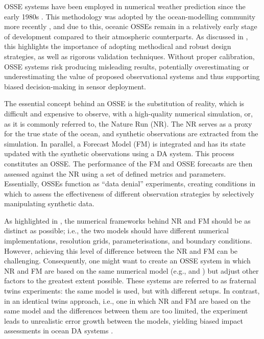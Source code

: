 OSSE systems have been employed in numerical weather prediction since the early 1980s \parencite{atlas1985impact, atlas1997atmospheric}. This methodology was adopted by the ocean-modelling community more recently \parencite{mourre2006relative, oke2007impact}, and due to this, oceanic OSSEs remain in a relatively early stage of development compared to their atmospheric counterparts. As discussed in \parencite{halliwell2014Rigorous}, this highlights the importance of adopting methodical and robust design strategies, as well as rigorous validation techniques. Without proper calibration, OSSE systems risk producing misleading results, potentially overestimating or underestimating the value of proposed observational systems and thus supporting biased decision-making in sensor deployment.

The essential concept behind an OSSE is the substitution of reality, which is difficult and expensive to observe, with a high-quality numerical simulation, or, as it is commonly referred to, the Nature Run (NR). The NR serves as a proxy for the true state of the ocean, and synthetic observations are extracted from the simulation. In parallel, a Forecast Model (FM) is integrated and has its state updated with the synthetic observations using a DA system. This process constitutes an OSSE. The performance of the FM and OSSE forecasts are then assessed against the NR using a set of defined metrics and parameters. Essentially, OSSEs function as “data denial” experiments, creating conditions in which to assess the effectiveness of different observation strategies by selectively manipulating synthetic data.

As highlighted in \parencite{halliwell2014Rigorous, halliwell2015osse}, the numerical frameworks behind NR and FM should be as distinct as possible; i.e., the two models should have different numerical implementations, resolution grids, parameterisations, and boundary conditions. However, achieving this level of difference between the NR and FM can be challenging. Consequently, one might want to create an OSSE system in which NR and FM are based on the same numerical model (e.g., \textcite{ford2021assimilating} and \textcite{fennel2022ocean}) but adjust other factors to the greatest extent possible. These systems are referred to as fraternal twins experiments: the same model is used, but with different setups. In contrast, in an identical twins approach, i.e., one in which NR and FM are based on the same model and the differences between them are too limited, the experiment leads to unrealistic error growth between the models, yielding biased impact assessments in ocean DA systems \parencite{yu2019evaluation}.

